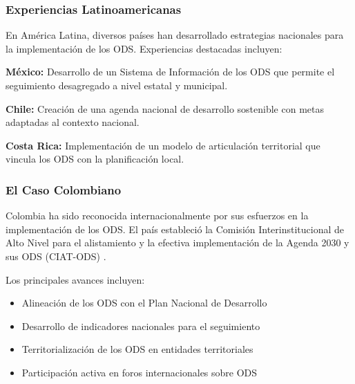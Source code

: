 \subsubsection{Experiencias Latinoamericanas}

En América Latina, diversos países han desarrollado estrategias nacionales para la implementación de los ODS. Experiencias destacadas incluyen:

\textbf{México:} Desarrollo de un Sistema de Información de los ODS que permite el seguimiento desagregado a nivel estatal y municipal.

\textbf{Chile:} Creación de una agenda nacional de desarrollo sostenible con metas adaptadas al contexto nacional.

\textbf{Costa Rica:} Implementación de un modelo de articulación territorial que vincula los ODS con la planificación local.

\subsubsection{El Caso Colombiano}

Colombia ha sido reconocida internacionalmente por sus esfuerzos en la implementación de los ODS. El país estableció la Comisión Interinstitucional de Alto Nivel para el alistamiento y la efectiva implementación de la Agenda 2030 y sus ODS (CIAT-ODS) \citep{gobierno_colombia_2018}.

Los principales avances incluyen:

\begin{itemize}
    \item Alineación de los ODS con el Plan Nacional de Desarrollo
    \item Desarrollo de indicadores nacionales para el seguimiento
    \item Territorialización de los ODS en entidades territoriales
    \item Participación activa en foros internacionales sobre ODS
\end{itemize}
